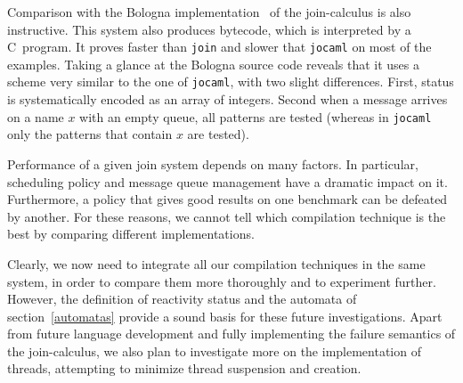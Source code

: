 Comparison with the Bologna implementation~\cite{Bologna} of the
join-calculus is also instructive.  This system also produces
bytecode, which is interpreted by a C~program.  It proves faster than
{\tt join} and slower that {\tt jocaml} on most of the examples.
Taking a glance at the Bologna source code reveals that it uses a
scheme very similar to the one of {\tt jocaml}, with two slight
differences.  First, status is systematically encoded as an array of
integers.  Second when a message arrives on a name $x$ with an empty
queue, all patterns are tested (whereas in {\tt jocaml} only the
patterns that contain $x$ are tested).

Performance of a given join system depends on many factors. In
particular, scheduling policy and message queue management have a
dramatic impact on it. Furthermore, a policy that gives good results
on one benchmark can be defeated by another.  For these reasons, we
cannot tell which compilation technique is the best by comparing
different implementations.



Clearly, we now need to integrate all our compilation techniques in
the same system, in order to compare them more thoroughly and to
experiment further.  However, the definition of reactivity status and
the automata of section~\ref{automatas} provide a sound
basis for these future investigations.  Apart from future language
development and fully implementing the failure semantics of the
join-calculus, we also plan to investigate more on the implementation
of threads, attempting to minimize thread suspension and creation.









%
%
%
